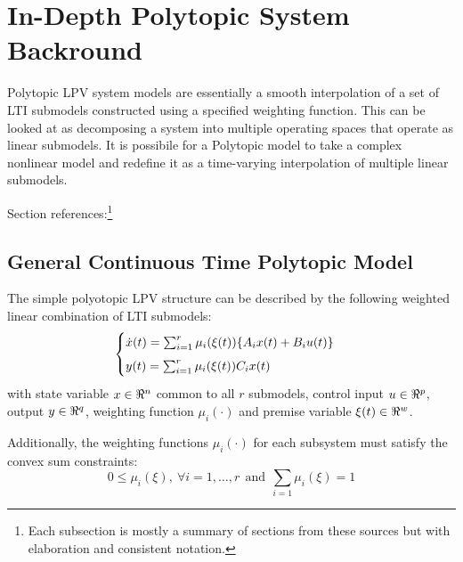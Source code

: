 \documentclass[]{article}
\begin{document}
%
%



\onecolumn
\newpage
\appendix
\section{In-Depth Polytopic System Backround} \label{apx:PolytopicSystemsBackround}
Polytopic LPV system models are essentially a smooth interpolation of a set of LTI submodels constructed using a specified weighting function. This can be looked at as decomposing a system into multiple operating spaces that operate as linear submodels. It is possibile for a Polytopic model to take a complex nonlinear model and redefine it as a time-varying interpolation of multiple linear submodels.

Section references:\footnote{Each subsection is mostly a summary of sections from these sources but with elaboration and consistent notation.}
\cite{beelen2017joint} \cite{ORJUELA2019295} \cite{orjuela2013nonlinear}\\

\subsection{General Continuous Time Polytopic Model} 
The simple polyotopic LPV structure can be described by the following weighted linear combination of LTI submodels:
\begin{equation}\label{eq:CT_poly_sys_def}
	\begin{cases}
		\dot{x}(t) 	= \sum_{i=1}^r \mu_i(\xi(t))\{A_i x(t) + B_i u(t)\}  \vspace{5pt} \\ 
		y(t)		= \sum_{i=1}^r \mu_i(\xi(t)) C_i x(t)
	\end{cases}
\end{equation}
with state variable $x \in \real^n$ common to all $r$ submodels, control input $u \in \real^p$, output $y \in \real^q$, weighting function $\mu_i(\cdot)$ and premise variable $\xi(t) \in \real^{w}$. 

Additionally, the weighting functions $\mu_i (\cdot)$ for each subsystem must satisfy the convex sum constraints:
\begin{equation}\label{eq:convex_sum_constraints}
	0 \leq \mu_i(\xi), \ \forall i = 1,\dots,r \ \ \text{and} \ \ \sum_{i=1} \mu_i(\xi) = 1
\end{equation}

\end{document}
